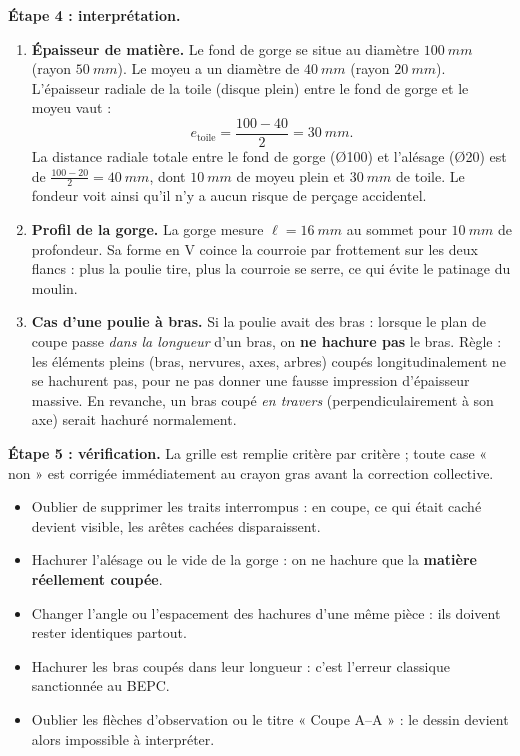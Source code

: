 \documentclass[11pt]{article}
\begin{document}
\begin{exoresolu}
\textbf{Étape 4 : interprétation.}
\begin{enumerate}
\item \textbf{Épaisseur de matière.} Le fond de gorge se situe au diamètre $\SI{100}{mm}$ (rayon $\SI{50}{mm}$). Le moyeu a un diamètre de $\SI{40}{mm}$ (rayon $\SI{20}{mm}$). L'épaisseur radiale de la toile (disque plein) entre le fond de gorge et le moyeu vaut :
\[ e_{\text{toile}} = \frac{100 - 40}{2} = \SI{30}{mm}. \]
La distance radiale totale entre le fond de gorge (Ø100) et l'alésage (Ø20) est de $\frac{100-20}{2} = \SI{40}{mm}$, dont $\SI{10}{mm}$ de moyeu plein et $\SI{30}{mm}$ de toile. Le fondeur voit ainsi qu'il n'y a aucun risque de perçage accidentel.
\item \textbf{Profil de la gorge.} La gorge mesure $\ell = \SI{16}{mm}$ au sommet pour $\SI{10}{mm}$ de profondeur. Sa forme en V coince la courroie par frottement sur les deux flancs : plus la poulie tire, plus la courroie se serre, ce qui évite le patinage du moulin.
\item \textbf{Cas d'une poulie à bras.} Si la poulie avait des bras : lorsque le plan de coupe passe \emph{dans la longueur} d'un bras, on \textbf{ne hachure pas} le bras. Règle : les éléments pleins (bras, nervures, axes, arbres) coupés longitudinalement ne se hachurent pas, pour ne pas donner une fausse impression d'épaisseur massive. En revanche, un bras coupé \emph{en travers} (perpendiculairement à son axe) serait hachuré normalement.
\end{enumerate}

\textbf{Étape 5 : vérification.} La grille est remplie critère par critère ; toute case « non » est corrigée immédiatement au crayon gras avant la correction collective.
\end{exoresolu}

\begin{attention}
\begin{itemize}
\item Oublier de supprimer les traits interrompus : en coupe, ce qui était caché devient visible, les arêtes cachées disparaissent.
\item Hachurer l'alésage ou le vide de la gorge : on ne hachure que la \textbf{matière réellement coupée}.
\item Changer l'angle ou l'espacement des hachures d'une même pièce : ils doivent rester identiques partout.
\item Hachurer les bras coupés dans leur longueur : c'est l'erreur classique sanctionnée au BEPC.
\item Oublier les flèches d'observation ou le titre « Coupe A--A » : le dessin devient alors impossible à interpréter.
\end{itemize}
\end{attention}
\end{document}

